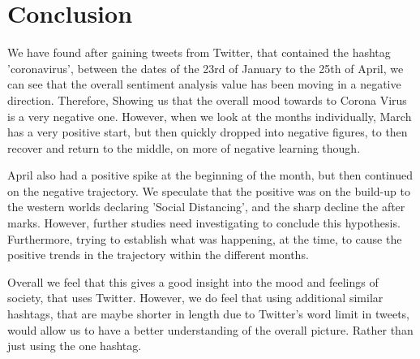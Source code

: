 \documentclass[a4paper,10pt]{article}
\begin{document}
\section{Conclusion}
We have found after gaining tweets from Twitter, that contained the hashtag 'coronavirus', between the dates of the 23rd of January to the 25th of April, we can see that the overall sentiment analysis value has been moving in a negative direction. Therefore, Showing us that the overall mood towards to Corona Virus is a very negative one. However, when we look at the months individually, March has a very positive start, but then quickly dropped into negative figures, to then recover and return to the middle, on more of negative learning though.

April also had a positive spike at the beginning of the month, but then continued on the negative trajectory. We speculate that the positive was on the build-up to the western worlds declaring 'Social Distancing', and the sharp decline the after marks. However, further studies need investigating to conclude this hypothesis. Furthermore, trying to establish what was happening, at the time, to cause the positive trends in the trajectory within the different months.

Overall we feel that this gives a good insight into the mood and feelings of society, that uses Twitter. However, we do feel that using additional similar hashtags, that are maybe shorter in length due to Twitter's word limit in tweets, would allow us to have a better understanding of the overall picture. Rather than just using the one hashtag.


\newpage
%	

	
\end{document}
